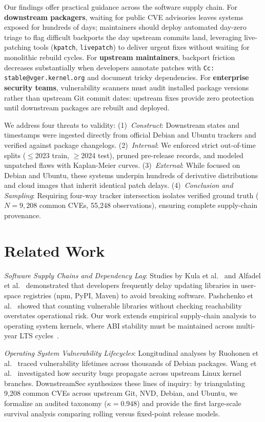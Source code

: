 \documentclass[graybox]{svmult}
\begin{document}
Our findings offer practical guidance across the software supply chain. For \textbf{downstream packagers}, waiting for public CVE advisories leaves systems exposed for hundreds of days; maintainers should deploy automated day-zero triage to flag difficult backports the day upstream commits land, leveraging live-patching tools (\texttt{kpatch}, \texttt{livepatch}) to deliver urgent fixes without waiting for monolithic rebuild cycles. For \textbf{upstream maintainers}, backport friction decreases substantially when developers annotate patches with \texttt{Cc: stable@vger.kernel.org} and document tricky dependencies. For \textbf{enterprise security teams}, vulnerability scanners must audit installed package versions rather than upstream Git commit dates: upstream fixes provide zero protection until downstream packages are rebuilt and deployed.

We address four threats to validity:
(1)~\textit{Construct}: Downstream states and timestamps were ingested directly from official Debian and Ubuntu trackers and verified against package changelogs.
(2)~\textit{Internal}: We enforced strict out-of-time splits ($\le$2023 train, $\ge$2024 test), pruned pre-release records, and modeled unpatched flaws with Kaplan-Meier curves.
(3)~\textit{External}: While focused on Debian and Ubuntu, these systems underpin hundreds of derivative distributions and cloud images that inherit identical patch delays.
(4)~\textit{Conclusion and Sampling}: Requiring four-way tracker intersection isolates verified ground truth ($N = 9,208$ common CVEs, 55,248 observations), ensuring complete supply-chain provenance.

\section{Related Work}
\label{sec:related}

\textit{Software Supply Chains and Dependency Lag}: Studies by Kula et al.~\cite{kula2018empirical} and Alfadel et al.~\cite{alfadel2021empirical} demonstrated that developers frequently delay updating libraries in user-space registries (npm, PyPI, Maven) to avoid breaking software. Pashchenko et al.~\cite{pashchenko2020vulnerable} showed that counting vulnerable libraries without checking reachability overstates operational risk. Our work extends empirical supply-chain analysis to operating system kernels, where ABI stability must be maintained across multi-year LTS cycles~\cite{decoster2022measuring}.

\textit{Operating System Vulnerability Lifecycles}: Longitudinal analyses by Ruohonen et al.~\cite{ruohonen2018empirical, ruohonen2019tracking} traced vulnerability lifetimes across thousands of Debian packages. Wang et al.~\cite{wang2020empirical} investigated how security bugs propagate across upstream Linux kernel branches. DownstreamSec synthesizes these lines of inquiry: by triangulating 9,208 common CVEs across upstream Git, NVD, Debian, and Ubuntu, we formalize an audited taxonomy ($\kappa = 0.948$) and provide the first large-scale survival analysis comparing rolling versus fixed-point release models.
\end{document}
